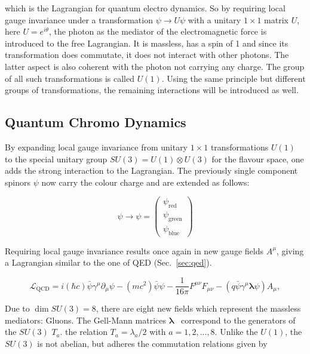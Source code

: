 \noindent which is the Lagrangian for quantum electro dynamics. So by requiring local gauge invariance under a transformation $\psi \rightarrow U \psi$ with a unitary $1 \times 1$ matrix $U$, here $U = e^{i \theta}$, the photon as the mediator of the electromagnetic force is introduced to the free Lagrangian. It is massless, has a spin of 1 and since its transformation does commutate, it does not interact with other photons. The latter aspect is also coherent with the photon not carrying any charge. The group of all such transformations is called $U(1)$. Using the same principle but different groups of transformations, the remaining interactions will be introduced as well.

\subsection{Quantum Chromo Dynamics}
\label{sec:qcd}

By expanding local gauge invariance from unitary $1 \times 1$ transformations $U(1)$ to the special unitary group $SU(3) = U(1) \otimes U(3)$ for the flavour space, one adds the strong interaction to the Lagrangian. The previously single component spinors $\psi$ now carry the colour charge and are extended as follows:

\begin{equation}
  \label{eq:colorspinor}
  \psi \rightarrow \psi = \begin{pmatrix}
    \psi_{\text{red}} \\
    \psi_{\text{green}} \\
    \psi_{\text{blue}}
  \end{pmatrix}
\end{equation}

\noindent Requiring local gauge invariance results once again in new gauge fields $A^\mu$, giving a Lagrangian similar to the one of QED (Sec.~\ref{sec:qed}).

\begin{equation}
  \label{eq:qcdlagrangian}
  \mathcal{L}_{\text{QCD}} = i (\hbar c) \bar{\psi} \gamma^\mu \partial_\mu \psi - (m c^2) \bar{\psi} \psi - \frac{1}{16 \pi} F^{\mu \nu} F_{\mu \nu} - (q \bar{\psi} \gamma^\mu \mathbf{\lambda} \psi) A_\mu,
\end{equation}

Due to $\dim{SU(3)} = 8$, there are eight new fields which represent the massless mediators: Gluons. The Gell-Mann matrices $\mathbf{\lambda}$~\cite{gellmann} correspond to the generators of the $SU(3)$ $T_a$. the relation $T_a = \lambda_a / 2$ with $a = 1, 2, ..., 8$. Unlike the $U(1)$, the $SU(3)$ is not abelian, but adheres the commutation relations given by


